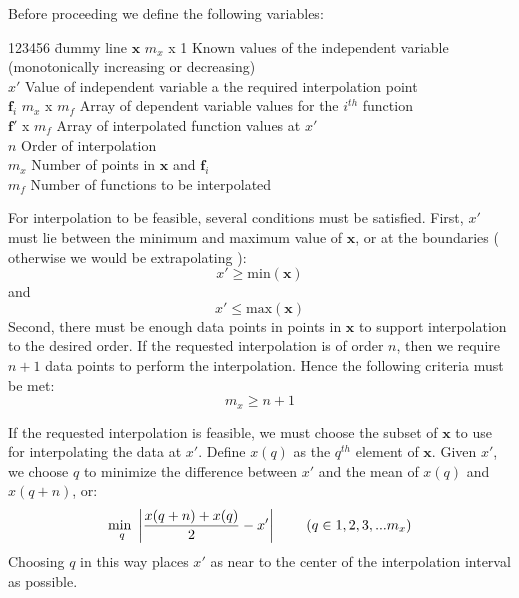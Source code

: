 Before proceeding we define the following variables:
%
\begin{center}
    \begin{minipage}[t]{5.0 in}
        \begin{tabbing}[htbp!]
            123456 \= dummy line \kill
            $\mathbf{x}$ \> $m_x$ x 1 Known values of the independent variable (monotonically increasing or decreasing) \\
            $x'$ \>  Value of independent variable a the required interpolation point\\
            $\mathbf{f}_i$ \> $m_x$ x $m_f$ Array of dependent variable values for the $i^{th}$ function\\
            $\mathbf{f}'$  x $m_f$ Array of interpolated function values at $x'$\\
            $n$ \> Order of interpolation \\
            $m_x$  \>  Number of points in $\mathbf{x}$ and $\mathbf{f}_i$ \\
            $m_f$  \>  Number of functions to be interpolated \\
        \end{tabbing}
    \end{minipage}
\end{center}

For interpolation to be feasible, several conditions must be
satisfied.  First, $x'$ must lie between the minimum and maximum
value of $\mathbf{x}$, or at the boundaries ( otherwise we would be
extrapolating ):
%
\begin{equation}
     x' \geq \mbox{min}(\mathbf{x})
\end{equation}
%
and
%
\begin{equation}
     x' \leq \mbox{max}(\mathbf{x})
\end{equation}
%
Second, there must be enough data points in points in $\mathbf{x}$
to support interpolation to the desired order.  If the requested
interpolation is of order $n$, then we require $n+1$ data points to
perform the interpolation.  Hence the following criteria must be
met:
%
\begin{equation}
    m_x \geq n + 1
\end{equation}
%

If the requested interpolation is feasible, we must choose the
subset of $\mathbf{x}$ to use for interpolating the data at $x'$.
Define $x(q)$ as the $q^{th}$ element of $\mathbf{x}$. Given $x'$,
we choose $q$ to minimize the difference between $x'$ and the mean
of $x(q)$ and $x(q + n)$, or:
%
\begin{equation}
    \underset{q}{\mbox{min }} \left| \frac{x(q+n) + x(q)}{2} - x'\right|  \hspace{.3 in} ( q \in 1,2,3,... m_x)
\end{equation}
%
Choosing $q$ in this way places $x'$ as near to the center of the
interpolation interval as possible.

